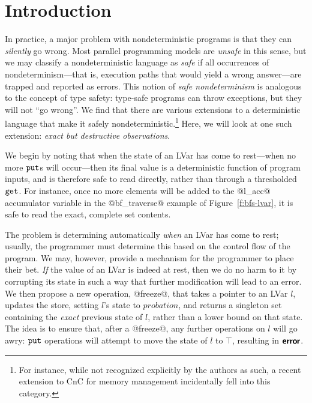 \section{Introduction} \label{section:intro}


In practice, a major problem with nondeterministic programs is that
they can {\em silently} go wrong.  Most parallel programming models
are {\em unsafe} in this sense, but we may classify a nondeterministic
language as {\em safe} if all occurrences of nondeterminism---that is,
execution paths that would yield a wrong answer---are trapped and
reported as errors.  This notion of \emph{safe nondeterminism} is
analogous to the concept of type safety: type-safe programs can throw
exceptions, but they will not ``go wrong''.  We find that there are
various extensions to a deterministic language that make it safely
nondeterministic.\footnote{For instance, while not recognized
  explicitly by the authors as such, a recent extension to CnC for
  memory management \cite{cnc-space-folding} incidentally fell into
  this category.}  Here, we will look at one such extension:
\emph{exact but destructive observations}.

We begin by noting that when the state of an LVar has come to
rest---when no more $\mbox{\texttt{put}}$s will occur---then its final value is a
deterministic function of program inputs, and is therefore safe to
read directly, rather than through a thresholded $\mbox{\texttt{get}}$.  For
instance, once no more elements will be added to the @l_acc@
accumulator variable in the @bf_traverse@ example of
Figure~\ref{f:bfs-lvar}, it is safe to read the exact, complete set
contents.

The problem is determining automatically {\em when} an LVar has come
to rest; usually, the programmer must determine this based on the
control flow of the program.  We may, however, provide a mechanism for
the programmer to place their bet.  {\em If} the value of an LVar is
indeed at rest, then we do no harm to it by corrupting its state in
such a way that further modification will lead to an error.  We then
propose a new operation, @freeze@, that takes a pointer to an LVar
$l$, updates the store, setting $l$'s state to $\textit{probation}$,
and returns a singleton set containing the {\em exact} previous state
of $l$, rather than a lower bound on that state.  The idea is to
ensure that, after a @freeze@, any further operations on $l$ will go
awry: $\mbox{\texttt{put}}$ operations will attempt to move the state of $l$ to
$\top$, resulting in $\textbf{\textsf{error}}$.

